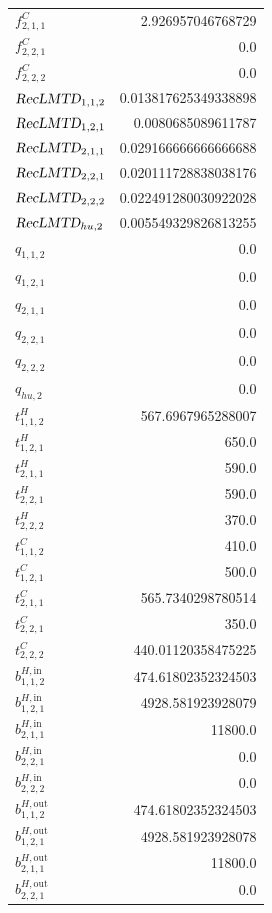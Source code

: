 \documentclass{article}%
\begin{document}
\begin{multicols*}{3}
\begin{supertabular}{lr}
	$f_{2,1,1}^{C}$ & 2.926957046768729 \\%
	$f_{2,2,1}^{C}$ & 0.0 \\%
	$f_{2,2,2}^{C}$ & 0.0 \\%
	$\textsl{RecLMTD}_{1,1,2}$ & 0.013817625349338898 \\%
	$\textsl{RecLMTD}_{1,2,1}$ & 0.0080685089611787 \\%
	$\textsl{RecLMTD}_{2,1,1}$ & 0.029166666666666688 \\%
	$\textsl{RecLMTD}_{2,2,1}$ & 0.020111728838038176 \\%
	$\textsl{RecLMTD}_{2,2,2}$ & 0.022491280030922028 \\%
	$\textsl{RecLMTD}_{hu,2}$ & 0.005549329826813255 \\%
	$q_{1,1,2}$ & 0.0 \\%
	$q_{1,2,1}$ & 0.0 \\%
	$q_{2,1,1}$ & 0.0 \\%
	$q_{2,2,1}$ & 0.0 \\%
	$q_{2,2,2}$ & 0.0 \\%
	$q_{hu,2}$ & 0.0 \\%
	$t_{1,1,2}^{H}$ & 567.6967965288007 \\%
	$t_{1,2,1}^{H}$ & 650.0 \\%
	$t_{2,1,1}^{H}$ & 590.0 \\%
	$t_{2,2,1}^{H}$ & 590.0 \\%
	$t_{2,2,2}^{H}$ & 370.0 \\%
	$t_{1,1,2}^{C}$ & 410.0 \\%
	$t_{1,2,1}^{C}$ & 500.0 \\%
	$t_{2,1,1}^{C}$ & 565.7340298780514 \\%
	$t_{2,2,1}^{C}$ & 350.0 \\%
	$t_{2,2,2}^{C}$ & 440.01120358475225 \\%
	$b_{1,1,2}^{H,\text{in}}$ & 474.61802352324503 \\%
	$b_{1,2,1}^{H,\text{in}}$ & 4928.581923928079 \\%
	$b_{2,1,1}^{H,\text{in}}$ & 11800.0 \\%
	$b_{2,2,1}^{H,\text{in}}$ & 0.0 \\%
	$b_{2,2,2}^{H,\text{in}}$ & 0.0 \\%
	$b_{1,1,2}^{H,\text{out}}$ & 474.61802352324503 \\%
	$b_{1,2,1}^{H,\text{out}}$ & 4928.581923928078 \\%
	$b_{2,1,1}^{H,\text{out}}$ & 11800.0 \\%
	$b_{2,2,1}^{H,\text{out}}$ & 0.0 \\%

\end{supertabular}
\end{multicols*}
\end{document}
